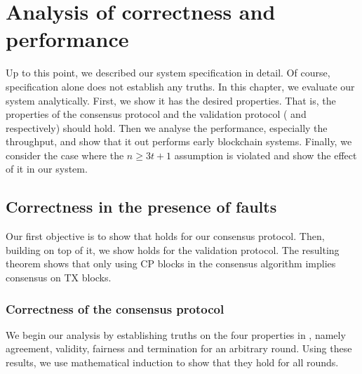 \chapter{Analysis of correctness and performance}
\label{ch:analysis}

Up to this point, we described our system specification in detail.
Of course, specification alone does not establish any truths.
In this chapter, we evaluate our system analytically.
First, we show it has the desired properties.
That is, the properties of the consensus protocol and the validation protocol ( and  respectively) should hold.
Then we analyse the performance, especially the throughput,
and show that it out performs early blockchain systems.
Finally, we consider the case where the $n \ge 3t + 1$ assumption is violated and show the effect of it in our system.

\section{Correctness in the presence of faults}
Our first objective is to show that  holds for our consensus protocol.
Then, building on top of it, we show  holds for the validation protocol.
The resulting theorem shows that only using CP blocks in the consensus algorithm implies consensus on TX blocks.


\subsection{Correctness of the consensus protocol}

We begin our analysis by establishing truths on the four properties in ,
namely agreement, validity, fairness and termination for an arbitrary round.
Using these results, we use mathematical induction to show that they hold for all rounds.

